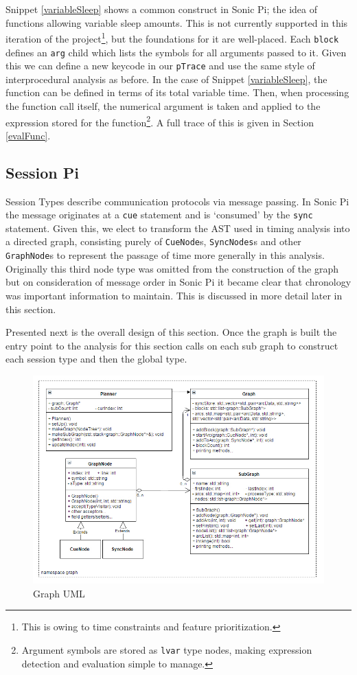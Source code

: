 \documentclass[11pt, abstracton, twoside, titlepage=true]{scrartcl}
\begin{document}
Snippet \ref{variableSleep} shows a common construct in Sonic Pi; the idea of 
functions allowing variable sleep amounts. This is not currently supported in this 
iteration of the project\footnote{This is owing to time constraints and feature prioritization.}, but the foundations for it are well-placed. Each 
\texttt{block} defines an \texttt{arg} child which lists the symbols for all 
arguments passed to it. Given this we can define a new keycode in our \texttt{pTrace}
and use the same style of interprocedural analysis as before. In the case of Snippet 
\ref{variableSleep}, the function can be defined in terms of its total variable time.
Then, when processing the function call itself, the numerical argument is taken and 
applied to the expression stored for the function\footnote{Argument symbols are 
stored as \texttt{lvar} type nodes, making expression detection and evaluation 
simple to manage.}. A full trace of this is given in Section \ref{evalFunc}.

\subsection{Session Pi}
Session Types describe communication protocols via message passing. In Sonic Pi
the message originates at a \texttt{cue} statement and is `consumed' by the
\texttt{sync} statement. Given this, we elect to transform the AST used in
timing analysis into a directed graph, consisting purely of \texttt{CueNode}s,
\texttt{SyncNodes}s and other \texttt{GraphNode}s to represent the passage
of time more generally in this analysis. Originally this third node type
was omitted from the construction of the graph but on consideration of
message order in Sonic Pi it became clear that chronology was important 
information to maintain. This is discussed in more detail later in this section.

Presented next is the overall design of this section. Once the graph is
built the entry point to the analysis for this section calls on each sub 
graph to construct each session type and then the global type.

\begin{figure}[h!]
	\centering
	\includegraphics[width=\textwidth]{images/session.jpg}
	\caption{Graph UML} \label{graphUML}
\end{figure}
\end{document}
